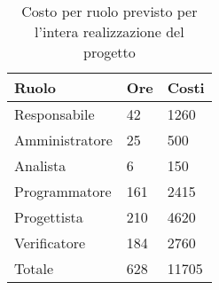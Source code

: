 	\begin{table}[H]
	 \centering
	 \begin{tabular}{p{}p{}
		  	  		  				p{}}
	  \toprule Ruolo & Ore  & Costi \\
	  \midrule
	  Responsabile & 42  & 1260 \\
	  Amministratore & 25 & 500 \\
	  Analista & 6 & 150 \\
	  Programmatore & 161  & 2415 \\
	  Progettista & 210  & 4620 \\
	  Verificatore & 184  & 2760 \\
	  \hline
	  Totale & 628  & 11705 \\
	  \bottomrule
	 \end{tabular}
	 \label{tab:costorendicontato}
	 \caption{Costo per ruolo previsto per l’intera realizzazione del progetto}
	\end{table}

